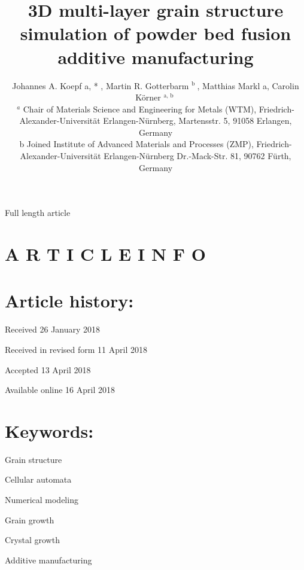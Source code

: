 \documentclass[10pt]{article}
\title{3D multi-layer grain structure simulation of powder bed fusion additive manufacturing }
\author{Johannes A. Koepf a, * , Martin R. Gotterbarm ${ }^{\text {b }}$, Matthias Markl a, Carolin Körner ${ }^{\text {a, b }}$\\
${ }^{a}$ Chair of Materials Science and Engineering for Metals (WTM), Friedrich-Alexander-Universität Erlangen-Nürnberg, Martensstr. 5, 91058 Erlangen,\\
Germany\\
b Joined Institute of Advanced Materials and Processes (ZMP), Friedrich-Alexander-Universität Erlangen-Nürnberg Dr.-Mack-Str. 81, 90762 Fürth, Germany}
\date{}
\begin{document}
\maketitle
Full length article



\section*{A R T I C L E I N F O}
\section*{Article history:}
Received 26 January 2018

Received in revised form 11 April 2018

Accepted 13 April 2018

Available online 16 April 2018

\section*{Keywords:}
Grain structure

Cellular automata

Numerical modeling

Grain growth

Crystal growth

Additive manufacturing
\end{document}
